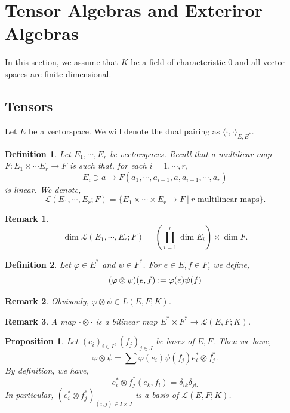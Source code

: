 \documentclass[8pt]{article}
\newtheorem{proposition}{Proposition}[section]
\newtheorem{definition}{Definition}[section]
\newtheorem{remark}{Remark}[section]
\newcommand{\defeq}{\vcentcolon=}
\newcommand{\sep}[0]{\:|\:}
\begin{document}
\section{Tensor Algebras and Exteriror Algebras}

In this section, we assume that  $K$ be a field of characteristic $0$ and all vector spaces are finite dimensional.
\subsection{Tensors}
Let $E$ be a vectorspace. We will denote the dual pairing as $\langle\cdot,\cdot\rangle_{E,E^*}$. 
\begin{definition}
  Let $E_1,\cdots,E_r$ be vectorspaces. Recall that a multiliear map $F:E_1\times\cdots E_r\to F$ is such that, for each $i=1,\cdots,r$,
  \begin{equation*}
    E_i\ni a\mapsto F(a_1,\cdots,a_{i-1},a,a_{i+1},\cdots,a_r)
  \end{equation*} 
  is linear. We denote,
  \begin{equation*}
    \mathcal{L}(E_1,\cdots,E_r;F) = \{E_1\times\cdots\times E_r\to F\sep \text{$r$-multilinear maps}\}.
  \end{equation*}
\end{definition}
\begin{remark}
  \begin{equation*}
    \dim \mathcal{L}(E_1,\cdots,E_r;F) = \left(\prod_{i=1}^r\dim E_i\right)\times \dim F.
  \end{equation*}
\end{remark}

\begin{definition}
  Let $\varphi\in E^*$ and $\psi\in F^*$. For $e\in E,f\in F$, we define,
  \begin{equation*}
    (\varphi\otimes\psi)(e,f)\defeq \varphi(e)\psi(f)
  \end{equation*}
\end{definition}

\begin{remark}
  Obvisouly, $\varphi\otimes\psi\in L(E,F;K)$.
\end{remark}
\begin{remark}
  A map $\cdot\otimes\cdot$ is a bilinear map $E^*\times F^*\to \mathcal{L}(E,F;K)$.
\end{remark}

\begin{proposition}
  Let $(e_i)_{i\in I},(f_j)_{j\in J}$ be bases of $E,F$. Then we have,
  \begin{equation*}
    \varphi\otimes\psi = \sum\varphi(e_i)\psi(f_j)e_i^*\otimes f_j^*.
  \end{equation*}
  By definition, we have,
  \begin{equation*}
    e_i^*\otimes f_j^*(e_k,f_l) = \delta_{ik}\delta_{jl.}
  \end{equation*}
  In particular, $(e_i^*\otimes f_j^*)_{(i,j)\in I\times J}$ is a basis of $\mathcal{L}(E,F;K)$.
\end{proposition}
\end{document}
